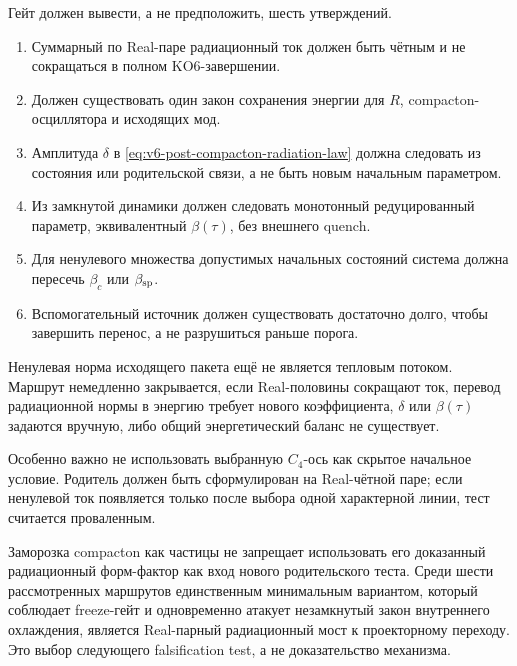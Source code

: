 Гейт
должен вывести, а не предположить, шесть утверждений.
\begin{enumerate}\raggedright
 \item Суммарный по Real-паре радиационный ток должен быть чётным и не
 сокращаться в полном KO6-завершении.
 \item Должен существовать один закон сохранения энергии для $R$,
 compacton-осциллятора и исходящих мод.
 \item Амплитуда $\delta$ в
 \eqref{eq:v6-post-compacton-radiation-law} должна следовать из состояния
 или родительской связи, а не быть новым начальным параметром.
 \item Из замкнутой динамики должен следовать монотонный редуцированный
 параметр, эквивалентный $\beta(\tau)$, без внешнего quench.
 \item Для ненулевого множества допустимых начальных состояний система
 должна пересечь $\beta_c$ или $\beta_{\rm sp}$.
 \item Вспомогательный источник должен существовать достаточно долго,
 чтобы завершить перенос, а не разрушиться раньше порога.
\end{enumerate}

\begin{nogocriterion}
Ненулевая норма исходящего пакета ещё не является тепловым потоком.
Маршрут немедленно закрывается, если Real-половины сокращают ток, перевод
радиационной нормы в энергию требует нового коэффициента, $\delta$ или
$\beta(\tau)$ задаются вручную, либо общий энергетический баланс не
существует.
\end{nogocriterion}

Особенно важно не использовать выбранную $C_4$-ось как скрытое начальное
условие. Родитель должен быть сформулирован на Real-чётной паре; если
ненулевой ток появляется только после выбора одной характерной линии,
тест считается проваленным.

\begin{theorem}
Заморозка compacton как частицы не запрещает использовать его доказанный
радиационный форм-фактор как вход нового родительского теста. Среди шести
рассмотренных маршрутов единственным минимальным вариантом, который
соблюдает freeze-гейт и одновременно атакует незамкнутый закон внутреннего
охлаждения, является Real-парный радиационный мост к проекторному переходу.
Это выбор следующего falsification test, а не доказательство механизма.
\end{theorem}


